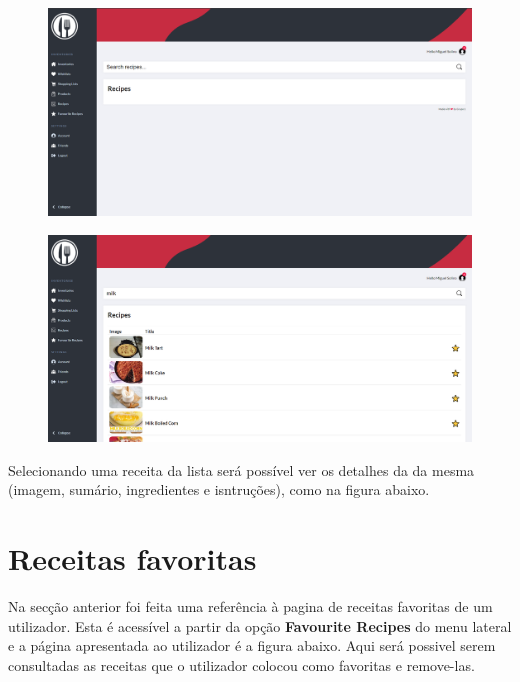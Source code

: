 \documentclass[a4paper]{report}
\begin{document}
    \begin{figure}[H]
        \centering
            \includegraphics[width=\textwidth]{images/produto_final/procura_de_receitas.png}
    \end{figure}

    \begin{figure}[H]
        \centering
            \includegraphics[width=\textwidth]{images/produto_final/procura_de_receitas_efetuadas.png}
    \end{figure}

    Selecionando uma receita da lista será possível ver os detalhes da
    da mesma (imagem, sumário, ingredientes e isntruções), como na 
    figura abaixo.

    \section{Receitas favoritas}

    Na secção anterior foi feita uma referência à pagina de receitas favoritas
    de um utilizador. Esta é acessível a partir da opção 
    \textbf{Favourite Recipes} do menu lateral e a página apresentada ao 
    utilizador é a figura abaixo. Aqui será possivel serem consultadas as
    receitas que o utilizador colocou como favoritas e remove-las.
\end{document}
